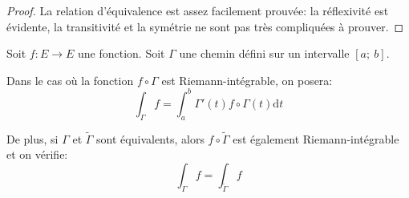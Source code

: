 \begin{proof}
La relation d'équivalence est assez facilement prouvée: la réflexivité est évidente, la transitivité et la symétrie ne sont pas très compliquées à prouver.
\end{proof}


\begin{theo}
Soit $f: E \to E$ une fonction. Soit $\Gamma$ une chemin défini sur un intervalle $[a;~b]$.

Dans le cas où la fonction $f \circ  \Gamma$ est Riemann-intégrable, on posera:
\[
\displaystyle{\int_{\Gamma}} f = \displaystyle{\int_a^b} \Gamma'(t) f \circ  \Gamma(t) \mathrm d t
\]

De plus, si $\Gamma$ et $\tilde{\Gamma}$ sont équivalents, alors $f \circ \tilde{\Gamma}$ est également Riemann-intégrable et on vérifie:
\[
\displaystyle{\int_{\Gamma}} f = \displaystyle{\int_{\tilde{\Gamma}}} f
\]
\end{theo}

